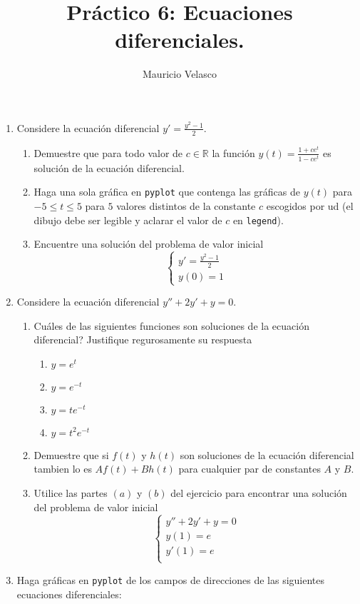 \documentclass[12pt, a4paper]{article}
\date{}
\begin{document}
\title{Pr\'actico 6: Ecuaciones diferenciales.}
\author{Mauricio Velasco}
\maketitle{}
\begin{enumerate}
\item Considere la ecuación diferencial $y'=\frac{y^2-1}{2}$.
\begin{enumerate}
\item Demuestre que para todo valor de $c\in \mathbb{R}$ la función $y(t)=\frac{1+ce^t}{1-ce^t}$ es solución de la ecuación diferencial.
\item Haga una sola gráfica en \verb!pyplot! que contenga las gráficas de  $y(t)$ para $-5\leq t\leq 5$ para $5$ valores distintos de la constante $c$ escogidos por ud (el dibujo debe ser legible y aclarar el valor de $c$ en \verb!legend!).
\item Encuentre una solución del problema de valor inicial
\[
\begin{cases}
y'=\frac{y^2-1}{2}\\
y(0)=1
\end{cases}
\]
\end{enumerate}
\item Considere la ecuación diferencial $y''+2y'+y=0$.
\begin{enumerate}
\item Cuáles de las siguientes funciones son soluciones de la ecuación diferencial? Justifique regurosamente su respuesta
\begin{enumerate}
\item $y=e^t$
\item $y=e^{-t}$
\item $y=te^{-t}$
\item $y=t^2e^{-t}$
\end{enumerate}
\item Demuestre que si $f(t)$ y $h(t)$ son soluciones de la ecuación diferencial tambien lo es $Af(t)+Bh(t)$ para cualquier par de constantes $A$ y $B$.
\item Utilice las partes $(a)$ y $(b)$ del ejercicio para encontrar una solución del problema de valor inicial
\[
\begin{cases}
y''+2y'+y=0\\
y(1)=e\\
y'(1)=e\\
\end{cases}
\]
\end{enumerate}
\item Haga gráficas en \verb!pyplot! de los campos de direcciones de las siguientes ecuaciones diferenciales:


\end{enumerate}
\end{document}
